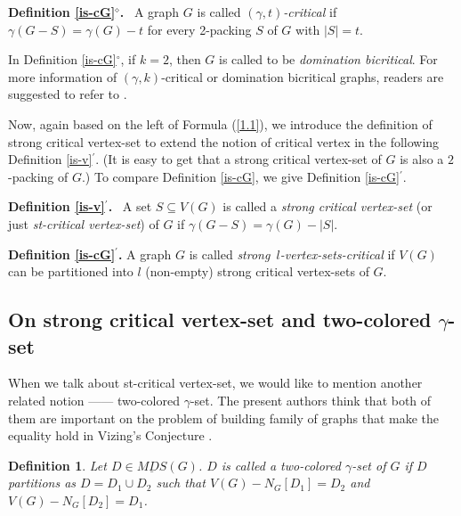 \documentclass[a4paper,11pt]{article}
\numberwithin{equation}{section}
\newtheorem{defn}[thm]{Definition}
\begin{document}
\vspace{9pt}
\noindent\textbf{Definition \ref{is-cG}$^\diamond$.}~\cite{Phillips}
 A graph $G$ is called \emph{$(\gamma,t)$-critical} if $\gamma(G-S)=\gamma(G)-t$ for every 2-packing $S$ of $G$ with $|S|=t$.

\vspace{9pt}

\noindent
In Definition \ref{is-cG}$^\circ$, if $k=2$, then $G$ is called to be \emph{domination bicritical}. For more information of  $(\gamma,k)$-critical or domination bicritical graphs, readers are suggested to refer to \cite{Mojdeh,Furuya,Furuya2,Mojdeh2,Krzywkowski,Chena}.

\vspace{11pt}
Now, again based on the left of Formula (\ref{1.1}), we introduce the definition of strong critical vertex-set to extend the notion of critical vertex in the following Definition \ref{is-v}$^\prime$. (It is easy to get that a strong critical vertex-set of $G$ is also a $2$-packing of $G$.)  To compare Definition \ref{is-cG}, we give Definition \ref{is-cG}$^\prime$.


\vspace{9pt}
\noindent\textbf{Definition \ref{is-v}$^\prime$.}~\cite{Zhao}
A set $S\subseteq V(G)$ is called a \emph{strong critical vertex-set}  (or just  \emph{st-critical vertex-set}) of $G$ if $\gamma(G-S)=\gamma(G)-|S|$.

\vspace{10pt}

\noindent\textbf{Definition \ref{is-cG}$^\prime$.}
A graph $G$ is called \emph{strong~$l$-vertex-sets-critical} if $V(G)$ can be partitioned into $l$ (non-empty) strong critical vertex-sets of $G$.



\subsection{On strong critical vertex-set and two-colored $\gamma$-set}

When we talk about st-critical vertex-set, we would like to mention another related notion ------ two-colored $\gamma$-set. The present authors think that both of them are important on the problem of building family of graphs that make the equality hold in Vizing's Conjecture \cite{Hartnell0,Zhao}.

\begin{defn}\label{is-v4}\emph{\cite{Hartnell0}}
\emph{Let $D\in \underline{MDS}(G)$. $D$ is called a} two-colored \emph{$\gamma$-set of $G$ if $D$  partitions as $D=D_1 \cup D_2$ such that $V(G)-N_G[D_1]=D_2$ and $V(G)-N_G[D_2]=D_1$.}
\end{defn}
\end{document}
